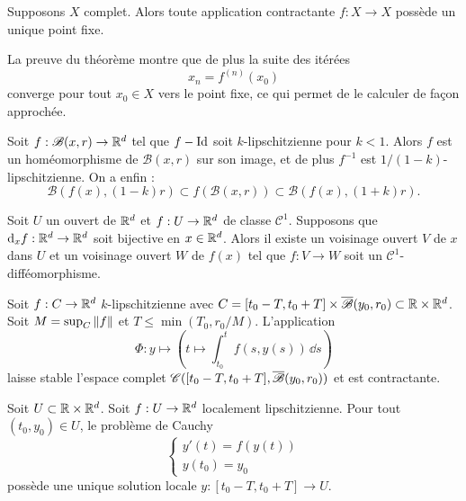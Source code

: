 \documentclass[twocolumn, landscape]{article}
\begin{document}
\begin{theo}
    Supposons $X$ complet. Alors toute application contractante $f : X\to X$ possède un unique point fixe.
\end{theo}

\begin{rema}
    La preuve du théorème montre que de plus la suite des itérées $$x_n = f^{(n)}(x_0)$$converge pour tout $x_0 \in X$ vers le point fixe, ce qui permet de le calculer de façon approchée.
\end{rema}

\begin{lemm}
    Soit $f: \mathscr{B}(x,r) \to \mathbb{R}^d$ tel que $f-\operatorname{Id}$ soit $k$-lipschitzienne pour $k<1$. Alors $f$ est un homéomorphisme de $\mathscr{B}(x,r)$ sur son image, et de plus $f^{-1}$ est $1/(1-k)$-lipschitzienne. On a enfin : 
    $$\mathscr{B}(f(x), (1-k)r) \subset f(\mathscr{B}(x,r)) \subset \mathscr{B}(f(x), (1+k)r).$$
\end{lemm}

\begin{appl}
    Soit $U$ un ouvert de $\mathbb{R}^d$ et $f: U\to \mathbb{R}^d$ de classe $\mathscr{C}^1$. Supposons que $\mathrm{d}_x f : \mathbb{R}^d \to \mathbb{R}^d$ soit bijective en $x\in \mathbb{R}^d$. Alors il existe un voisinage ouvert $V$ de $x$ dans $U$ et un voisinage ouvert $W$ de $f(x)$ tel que $f: V \to W$ soit un $\mathscr{C}^1$-difféomorphisme.
\end{appl}

\begin{lemm}
    Soit $f: C\to \mathbb{R}^d$ $k$-lipschitzienne avec $C = [t_0 -T, t_0 + T] \times \overline{\mathscr{B}}(y_0, r_0) \subset \mathbb{R} \times \mathbb{R}^d$. Soit $M = \sup_C \left\lVert f \right\rVert$ et $T \leq \min(T_0, r_0/M)$. L'application
    $$\Phi : y \mapsto (t \mapsto \int_{t_0}^t f(s, y(s)) \,\dd s)$$
    laisse stable l'espace complet $\mathscr{C}([t_0 - T, t_0 + T], \overline{\mathscr{B}}(y_0, r_0))$ et est contractante.
\end{lemm}

\begin{appl}
    Soit $U \subset \mathbb{R} \times \mathbb{R}^d$. Soit $f: U \to \mathbb{R}^d$ localement lipschitzienne. Pour tout $(t_0, y_0) \in U$, le problème de Cauchy 
    $$\begin{cases}
        y'(t) = f(y(t)) \\
        y(t_0) = y_0
    \end{cases}$$
    possède une unique solution locale $y : [t_0 -T, t_0 + T] \to U$.
\end{appl}
\end{document}
